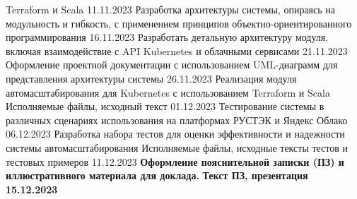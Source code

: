 {{Terraform и Scala}
%
      {}
%
      {11.11.2023}{}
    \projecttask{\projectsubtasknum}
      {Разработка архитектуры системы, опираясь на модульность и гибкость, с
применением принципов объектно-ориентированного программирования}
%
      {}
%
      {16.11.2023}{}
    \projecttask{\projectsubtasknum}
      {Разработать детальную архитектуру модуля, включая взаимодействие с API
Kubernetes и облачными сервисами}
%
      {}
%
      {21.11.2023}{}
    \projecttask{\projectsubtasknum}
      {Оформление проектной документации с использованием UML-диаграмм для
представления архитектуры системы}
%
      {}
%
      {26.11.2023}{}
    \projecttask{\projectsubtasknum}
      {Реализация модуля автомасштабирования для Kubernetes с использованием
Terraform и Scala}
%
      {Исполняемые файлы, исходный текст}
%
      {01.12.2023}{}
    \projecttask{\projectsubtasknum}
      {Тестирование системы в различных сценариях использования на платформах
РУСТЭК и Яндекс Облако}
%
      {}
%
      {06.12.2023}{}
    \projecttask{\projectsubtasknum}
      {Разработка набора тестов для оценки эффективности и надежности системы
автомасштабирования}
%
      {Исполняемые файлы, исходные тексты тестов и тестовых примеров}
%
      {11.12.2023}{}
  \projecttask{\bfseries\projecttasknum}
    {\bfseries Оформление пояснительной записки (ПЗ) и иллюстративного материала
для доклада.}
%
    {\bfseries Текст ПЗ, презентация}
%
    {\bfseries 15.12.2023}{}
}

\taskliterature{
  \nocite{pierce-types-2012-ru}
  \nocite{wolfengagen-methods-2008}
  \nocite{wolfengagen-combinatory-2008}
  \nocite{shapkin-automation-2022}
  \nocite{bernstein-containers-2014}
  \nocite{cats}
  \nocite{cats-effect}
  \nocite{iaas2017}
  \nocite{kubectl}
  \nocite{howard2022terraform}
  \nocite{carrion2022kubernetes}
  \nocite{turin2023predicting}
  \nocite{bijon2014formal}
  \nocite{amato2018improving}
  \nocite{de2012formal}
  \nocite{bohm2021profiling}
}


